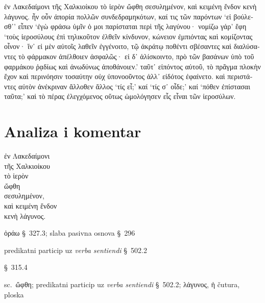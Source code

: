 {\large

\begin{greek}

\noindent ἐν Λακεδαίμονι τῆς Χαλκιοίκου τὸ ἱερὸν ὤφθη σεσυλημένον, καὶ κειμένη ἔνδον κενὴ λάγυνος. ἦν οὖν ἀπορία πολλῶν συνδεδραμηκότων, καί τις τῶν παρόντων `εἰ βούλεσθ᾽' εἶπεν `ἐγὼ φράσω ὑμῖν ὁ μοι παρίσταται περὶ τῆς λαγύνου· νομίζω γάρ' ἔφη `τοὺς ἱεροσύλους ἐπὶ τηλικοῦτον ἐλθεῖν κίνδυνον, κώνειον ἐμπιόντας καὶ κομίζοντας οἶνον· ἵν᾽ εἰ μὲν αὐτοῖς λαθεῖν ἐγγένοιτο, τῷ ἀκράτῳ ποθέντι σβέσαντες καὶ διαλύσαντες τὸ φάρμακον ἀπέλθοιεν ἀσφαλῶς· εἰ δ᾽ ἁλίσκοιντο, πρὸ τῶν βασάνων ὑπὸ τοῦ φαρμάκου ῥᾳδίως καὶ ἀνωδύνως ἀποθάνοιεν.' ταῦτ᾽ εἰπόντος αὐτοῦ, τὸ πρᾶγμα πλοκὴν ἔχον καὶ περινόησιν τοσαύτην οὐχ ὑπονοοῦντος ἀλλ᾽ εἰδότος ἐφαίνετο. καὶ περιστάντες αὐτὸν ἀνέκριναν ἄλλοθεν ἄλλος `τίς εἶ;' καί `τίς σ᾽ οἶδε;' καί `πόθεν ἐπίστασαι ταῦτα;' καὶ τὸ πέρας ἐλεγχόμενος οὕτως ὡμολόγησεν εἷς εἶναι τῶν ἱεροσύλων.

\end{greek}

}


\section*{Analiza i komentar}


{\large
\begin{greek}
\noindent ἐν Λακεδαίμονι \\
\tabto{2em} τῆς Χαλκιοίκου \\
τὸ ἱερὸν \\
ὤφθη \\
σεσυλημένον, \\
καὶ κειμένη ἔνδον \\
κενὴ λάγυνος.\\
 
\end{greek}
}

\begin{description}[noitemsep]
\item[ὤφθη] ὁράω §~327.3; slaba pasivna osnova §~296
\item[σεσυλημένον] predikatni particip uz \textit{verba sentiendi} §~502.2
\item[κειμένη] §~315.4
\item[κειμένη\dots\ κενὴ λάγυνος] sc.\ ὤφθη; predikatni particip uz \textit{verba sentiendi} §~502.2; λάγυνος, ἡ čutura, ploska
\end{description}



